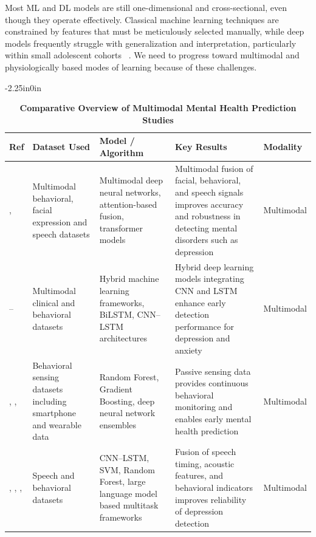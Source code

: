 \documentclass[10pt,letterpaper]{article}
\begin{document}
        Most ML and DL models are still one-dimensional and cross-sectional, even though they operate effectively. Classical machine learning techniques are constrained by features that must be meticulously selected manually, while deep models frequently struggle with generalization and interpretation, particularly within small adolescent cohorts ~\cite{ref15,ref16}. We need to progress toward multimodal and physiologically based modes of learning because of these challenges.

        \begin{table}[!t]
        \begin{adjustwidth}{-2.25in}{0in}
        \centering
        \caption{\textbf{Comparative Overview of Multimodal Mental Health Prediction Studies}}
        \label{tab:multimodal_comparison}
        \footnotesize
        \renewcommand{\arraystretch}{1.15}

        \begin{tabular}{|p{2.0cm}|p{3.5cm}|p{3.8cm}|p{4.8cm}|p{1.8cm}|}
        \hline
        \textbf{Ref} & \textbf{Dataset Used} & \textbf{Model / Algorithm} & \textbf{Key Results} & \textbf{Modality} \\
        \hline

        \cite{ref1},\cite{ref4}
        & Multimodal behavioral, facial expression and speech datasets
        & Multimodal deep neural networks, attention-based fusion, transformer models
        & Multimodal fusion of facial, behavioral, and speech signals improves accuracy and robustness in detecting mental disorders such as depression
        & Multimodal \\
        \hline

        \cite{ref5}--\cite{ref8}
        & Multimodal clinical and behavioral datasets
        & Hybrid machine learning frameworks, BiLSTM, CNN--LSTM architectures
        & Hybrid deep learning models integrating CNN and LSTM enhance early detection performance for depression and anxiety
        & Multimodal \\
        \hline

        \cite{ref9}, \cite{ref12}, \cite{ref26}
        & Behavioral sensing datasets including smartphone and wearable data
        & Random Forest, Gradient Boosting, deep neural network ensembles
        & Passive sensing data provides continuous behavioral monitoring and enables early mental health prediction
        & Multimodal \\
        \hline

        \cite{ref10}, \cite{ref14}, \cite{ref20}, \cite{ref27}
        & Speech and behavioral datasets
        & CNN--LSTM, SVM, Random Forest, large language model based multitask frameworks
        & Fusion of speech timing, acoustic features, and behavioral indicators improves reliability of depression detection
        & Multimodal \\
        \hline


\end{tabular}
\end{adjustwidth}
\end{table}
\end{document}
